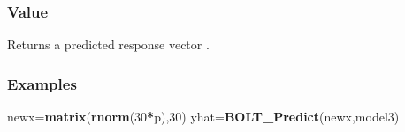 \documentclass[]{article}
\newenvironment{Shaded}{\begin{snugshade}}{\end{snugshade}}
\newcommand{\KeywordTok}[1]{\textcolor[rgb]{0.13,0.29,0.53}{\textbf{#1}}}
\newcommand{\DecValTok}[1]{\textcolor[rgb]{0.00,0.00,0.81}{#1}}
\newcommand{\OperatorTok}[1]{\textcolor[rgb]{0.81,0.36,0.00}{\textbf{#1}}}
\newcommand{\NormalTok}[1]{#1}
\begin{document}
\subsubsection{Value}\label{value-2}

Returns a predicted response vector .

\subsubsection{Examples}\label{examples-2}

\begin{Shaded}
\begin{Highlighting}[]
\NormalTok{newx=}\KeywordTok{matrix}\NormalTok{(}\KeywordTok{rnorm}\NormalTok{(}\DecValTok{30}\OperatorTok{*}\NormalTok{p),}\DecValTok{30}\NormalTok{)}
\NormalTok{yhat=}\KeywordTok{BOLT_Predict}\NormalTok{(newx,model3)}
\end{Highlighting}
\end{Shaded}
\end{document}
